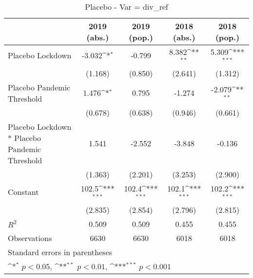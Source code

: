 \documentclass{article}
\begin{document}
{
\def\sym#1{\ifmmode^{#1}\else\(^{#1}\)\fi}
\begin{longtable}{l*{4}{c}}
\caption{Placebo - Var = div\_ref}\\
\hline\hline\endfirsthead\hline\endhead\hline\endfoot\endlastfoot
                &\multicolumn{1}{c}{2019 (abs.)}&\multicolumn{1}{c}{2019 (pop.)}&\multicolumn{1}{c}{2018 (abs.)}&\multicolumn{1}{c}{2018 (pop.)}\\
\hline
Placebo Lockdown&   -3.032\sym{*}  &   -0.799         &    8.382\sym{**} &    5.309\sym{***}\\
                &  (1.168)         &  (0.850)         &  (2.641)         &  (1.312)         \\
Placebo Pandemic Threshold&    1.476\sym{*}  &    0.795         &   -1.274         &   -2.079\sym{**} \\
                &  (0.678)         &  (0.638)         &  (0.946)         &  (0.661)         \\
Placebo Lockdown * Placebo Pandemic Threshold&    1.541         &   -2.552         &   -3.848         &   -0.136         \\
                &  (1.363)         &  (2.201)         &  (3.253)         &  (2.900)         \\
Constant        &    102.5\sym{***}&    102.4\sym{***}&    102.1\sym{***}&    102.2\sym{***}\\
                &  (2.835)         &  (2.854)         &  (2.796)         &  (2.815)         \\
\hline
\(R^{2}\)       &    0.509         &    0.509         &    0.455         &    0.455         \\
Observations    &     6630         &     6630         &     6018         &     6018         \\
\hline\hline
\multicolumn{5}{l}{\footnotesize Standard errors in parentheses}\\
\multicolumn{5}{l}{\footnotesize \sym{*} \(p<0.05\), \sym{**} \(p<0.01\), \sym{***} \(p<0.001\)}\\
\end{longtable}
}
\end{document}
